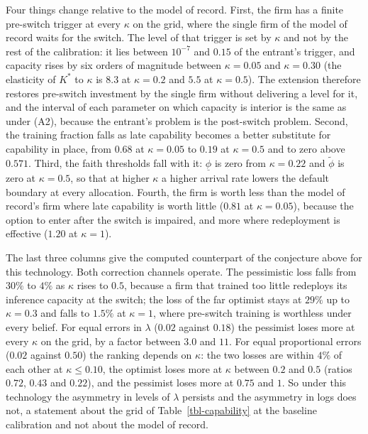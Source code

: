 \documentclass[
  11pt,
  letterpaper,
]{scrartcl}
\begin{document}
Four things change relative to the model of record. First, the firm has
a finite pre-switch trigger at every \(\kappa\) on the grid, where the
single firm of the model of record waits for the switch. The level of
that trigger is set by \(\kappa\) and not by the rest of the
calibration: it lies between \(10^{-7}\) and \(0.15\) of the entrant's
trigger, and capacity rises by six orders of magnitude between
\(\kappa = 0.05\) and \(\kappa = 0.30\) (the elasticity of \(K^*\) to
\(\kappa\) is \(8.3\) at \(\kappa = 0.2\) and \(5.5\) at
\(\kappa = 0.5\)). The extension therefore restores pre-switch
investment by the single firm without delivering a level for it, and the
interval of each parameter on which capacity is interior is the same as
under (A2), because the entrant's problem is the post-switch problem.
Second, the training fraction falls as late capability becomes a better
substitute for capability in place, from \(0.68\) at \(\kappa = 0.05\)
to \(0.19\) at \(\kappa = 0.5\) and to zero above \(0.571\). Third, the
faith thresholds fall with it: \(\underline{\phi}\) is zero from
\(\kappa = 0.22\) and \(\tilde{\phi}\) is zero at \(\kappa = 0.5\), so
that at higher \(\kappa\) a higher arrival rate lowers the default
boundary at every allocation. Fourth, the firm is worth less than the
model of record's firm where late capability is worth little (\(0.81\)
at \(\kappa = 0.05\)), because the option to enter after the switch is
impaired, and more where redeployment is effective (\(1.20\) at
\(\kappa = 1\)).

The last three columns give the computed counterpart of the conjecture
above for this technology. Both correction channels operate. The
pessimistic loss falls from \(30\%\) to \(4\%\) as \(\kappa\) rises to
\(0.5\), because a firm that trained too little redeploys its inference
capacity at the switch; the loss of the far optimist stays at \(29\%\)
up to \(\kappa = 0.3\) and falls to \(1.5\%\) at \(\kappa = 1\), where
pre-switch training is worthless under every belief. For equal errors in
\(\lambda\) (\(0.02\) against \(0.18\)) the pessimist loses more at
every \(\kappa\) on the grid, by a factor between \(3.0\) and \(11\).
For equal proportional errors (\(0.02\) against \(0.50\)) the ranking
depends on \(\kappa\): the two losses are within \(4\%\) of each other
at \(\kappa \leq 0.10\), the optimist loses more at \(\kappa\) between
\(0.2\) and \(0.5\) (ratios \(0.72\), \(0.43\) and \(0.22\)), and the
pessimist loses more at \(0.75\) and \(1\). So under this technology the
asymmetry in levels of \(\lambda\) persists and the asymmetry in logs
does not, a statement about the grid of Table~\ref{tbl-capability} at
the baseline calibration and not about the model of record.
\end{document}
